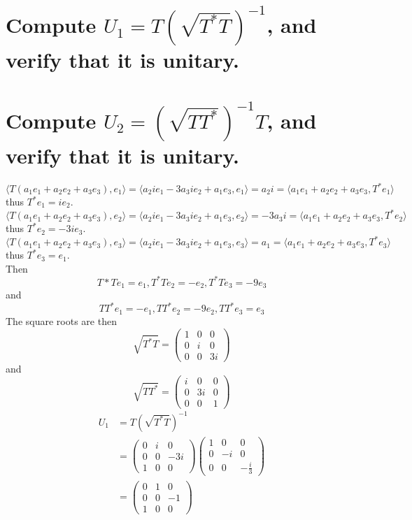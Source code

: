 \documentclass[answers]{exam}
\begin{document}
\begin{questions}
\begin{parts}
	\part{Compute $U_1 = T(\sqrt{T^*T})^{-1}$, and verify that it is unitary.}
	\part{Compute $U_2 = (\sqrt{TT^*})^{-1}T$, and verify that it is unitary.}
\end{parts}

\begin{solution}
	$$\langle T(a_1e_1+a_2e_2+a_3e_3), e_1 \rangle = \langle a_2ie_1 -3a_3ie_2 + a_1e_3, e_1 \rangle = a_2i = \langle a_1e_1+a_2e_2+a_3e_3,T^*e_1 \rangle$$
	thus $T^*e_1 = ie_2$.
	$$\langle T(a_1e_1+a_2e_2+a_3e_3), e_2 \rangle = \langle a_2ie_1 -3a_3ie_2 + a_1e_3, e_2 \rangle = -3a_3i = \langle a_1e_1+a_2e_2+a_3e_3,T^*e_2 \rangle$$
	thus $T^*e_2 = -3ie_3$.
	$$\langle T(a_1e_1+a_2e_2+a_3e_3), e_3 \rangle = \langle a_2ie_1 -3a_3ie_2 + a_1e_3, e_3 \rangle = a_1 = \langle a_1e_1+a_2e_2+a_3e_3,T^*e_3 \rangle$$
	thus $T^*e_3 = e_1$. \\
	Then
	$$T*Te_1 = e_1, T^*Te_2 = -e_2, T^*Te_3 = -9e_3$$
	and
	$$TT^*e_1 = -e_1, TT^*e_2 = -9e_2, TT^*e_3 = e_3$$
	The square roots are then
	$$\sqrt{T^*T} = \begin{pmatrix} 1 & 0 & 0 \\ 0 & i & 0 \\ 0 & 0 & 3i \end{pmatrix}$$
	and
	$$\sqrt{TT^*} = \begin{pmatrix} i & 0 & 0 \\ 0 & 3i & 0 \\ 0 & 0 & 1 \end{pmatrix}$$
	\begin{align*}
		U_1 &= T(\sqrt{T^*T})^{-1} \\
		    &= \begin{pmatrix} 0 & i & 0 \\ 0 & 0 & -3i \\ 1 & 0 & 0 \end{pmatrix} \begin{pmatrix} 1 & 0 & 0 \\ 0 & -i & 0 \\ 0 & 0 & -\frac{i}{3} \end{pmatrix} \\
		    &= \begin{pmatrix} 0 & 1 & 0 \\ 0 & 0 & -1 \\ 1 & 0 & 0 \end{pmatrix}

\end{align*}
\end{solution}
\end{questions}
\end{document}
